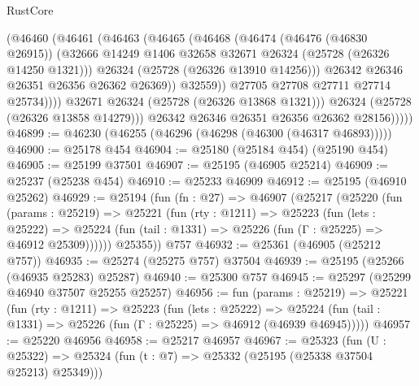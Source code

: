 \begin{lexlean}{RustCore}
\begin{coremodule}
                        (@46460
                          (@46461
                            (@46463
                              (@46465
                                (@46468
                                  (@46474
                                    (@46476 (@46830 @26915))
                                    (@32666
                                      @14249
                                      @1406
                                      @32658
                                      @32671
                                      @26324
                                      (@25728 (@26326 @14250 @1321)))
                                    @26324
                                    (@25728 (@26326 @13910 @14256)))
                                  @26342
                                  @26346
                                  @26351
                                  @26356
                                  @26362
                                  @26369))
                              @32559))
                          @27705
                          @27708
                          @27711
                          @27714
                          @25734))))
                  @32671
                  @26324
                  (@25728 (@26326 @13868 @1321)))
                @26324
                (@25728 (@26326 @13858 @14279)))
              @26342
              @26346
              @26351
              @26356
              @26362
              @28156)))))
@46899 := @46230 (@46255 (@46296 (@46298 (@46300 (@46317 @46893)))))
@46900 := @25178 @454
@46904 := @25180 (@25184 @454) (@25190 @454)
@46905 := @25199 @37501
@46907 := @25195 (@46905 @25214)
@46909 := @25237 (@25238 @454)
@46910 := @25233 @46909
@46912 := @25195 (@46910 @25262)
@46929 := @25194
    (fun (fn : @27) =>
    @46907
      (@25217
        (@25220
          (fun (params : @25219) =>
          @25221
            (fun (rty : @1211) =>
            @25223
              (fun (lets : @25222) =>
              @25224 (fun (tail : @1331) => @25226 (fun (Γ : @25225) => @46912 @25309))))))
        @25355))
    @757
@46932 := @25361 (@46905 (@25212 @757))
@46935 := @25274 (@25275 @757) @37504
@46939 := @25195 (@25266 (@46935 @25283) @25287)
@46940 := @25300 @757
@46945 := @25297 (@25299 @46940 @37507 @25255 @25257)
@46956 := fun (params : @25219) =>
  @25221
    (fun (rty : @1211) =>
    @25223
      (fun (lets : @25222) =>
      @25224 (fun (tail : @1331) => @25226 (fun (Γ : @25225) => @46912 (@46939 @46945)))))
@46957 := @25220 @46956
@46958 := @25217 @46957
@46967 := @25323
    (fun (U : @25322) => @25324 (fun (t : @7) => @25332 (@25195 (@25338 @37504 @25213) @25349)))

\end{coremodule}
\end{lexlean}
